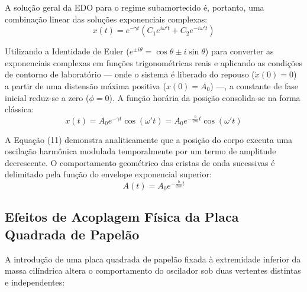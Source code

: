 \documentclass[12pt, a4paper]{article}
\begin{document}
A solução geral da EDO para o regime subamortecido é, portanto, uma combinação linear das soluções exponenciais complexas:
\begin{equation}
    x(t) = e^{-\gamma t} \left( C_1 e^{i\omega' t} + C_2 e^{-i\omega' t} \right)
\end{equation}

Utilizando a Identidade de Euler ($e^{\pm i\theta} = \cos\theta \pm i\sin\theta$) para converter as exponenciais complexas em funções trigonométricas reais e aplicando as condições de contorno de laboratório --- onde o sistema é liberado do repouso ($\dot{x}(0) = 0$) a partir de uma distensão máxima positiva ($x(0) = A_0$) ---, a constante de fase inicial reduz-se a zero ($\phi = 0$). A função horária da posição consolida-se na forma clássica:
\begin{equation}
    x(t) = A_0 e^{-\gamma t} \cos(\omega' t) = A_0 e^{-\frac{b}{2m}t} \cos(\omega' t)
\end{equation}

A Equação (11) demonstra analiticamente que a posição do corpo executa uma oscilação harmônica modulada temporalmente por um termo de amplitude decrescente. O comportamento geométrico das cristas de onda sucessivas é delimitado pela função do envelope exponencial superior:
\begin{equation}
    A(t) = A_0 e^{-\frac{b}{2m}t}
\end{equation}

\subsection{Efeitos de Acoplagem Física da Placa Quadrada de Papelão}

A introdução de uma placa quadrada de papelão fixada à extremidade inferior da massa cilíndrica altera o comportamento do oscilador sob duas vertentes distintas e independentes:
\end{document}
